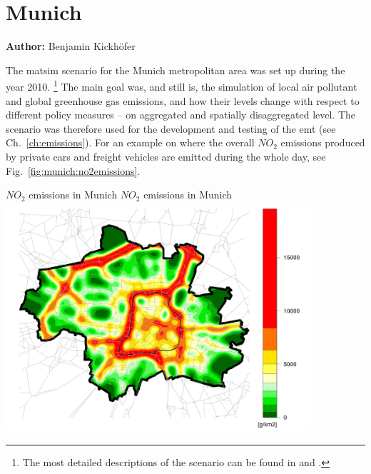 \section{Munich}
\label{ch:scenarios:munich}
\hfill \textbf{Author:} Benjamin Kickh\"ofer

The \acrshort{matsim} scenario for the Munich metropolitan area was set up during the year 2010.%
%
\footnote{
%
The most detailed descriptions of the scenario can be found in \citet{KickhoeferEtAl_VanoutriveVerhetsel_2013} and \citet{Kickhoefer_PhDThesis_2014}.
%
}
%
The main goal was, and still is, the simulation of local air pollutant and global greenhouse gas emissions, and how their levels change with respect to different policy measures -- on aggregated and spatially disaggregated level. The scenario was therefore used for the development and testing of the \gls{emt} (see Ch.~\ref{ch:emissions}). For an example on where the overall $\mathit{NO_2}$ emissions produced by private cars and freight vehicles are emitted during the whole day, see Fig.~\ref{fig:munich:no2emissions}.


\createfigure%
{$\mathit{NO_2}$ emissions in Munich}%
{$\mathit{NO_2}$ emissions in Munich}%
{\label{fig:munich:no2emissions}}%
{\includegraphics[width=0.85\textwidth, angle=0]{./using/figures/baseCase_1500_NO2_g_108000_0.png}}%
{}

